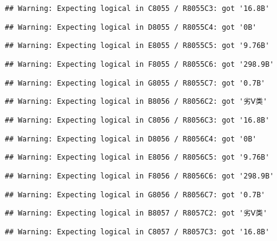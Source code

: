 \documentclass[
]{article}
\begin{document}
\begin{verbatim}
## Warning: Expecting logical in C8055 / R8055C3: got '16.8B'
\end{verbatim}

\begin{verbatim}
## Warning: Expecting logical in D8055 / R8055C4: got '0B'
\end{verbatim}

\begin{verbatim}
## Warning: Expecting logical in E8055 / R8055C5: got '9.76B'
\end{verbatim}

\begin{verbatim}
## Warning: Expecting logical in F8055 / R8055C6: got '298.9B'
\end{verbatim}

\begin{verbatim}
## Warning: Expecting logical in G8055 / R8055C7: got '0.7B'
\end{verbatim}

\begin{verbatim}
## Warning: Expecting logical in B8056 / R8056C2: got '劣Ⅴ类'
\end{verbatim}

\begin{verbatim}
## Warning: Expecting logical in C8056 / R8056C3: got '16.8B'
\end{verbatim}

\begin{verbatim}
## Warning: Expecting logical in D8056 / R8056C4: got '0B'
\end{verbatim}

\begin{verbatim}
## Warning: Expecting logical in E8056 / R8056C5: got '9.76B'
\end{verbatim}

\begin{verbatim}
## Warning: Expecting logical in F8056 / R8056C6: got '298.9B'
\end{verbatim}

\begin{verbatim}
## Warning: Expecting logical in G8056 / R8056C7: got '0.7B'
\end{verbatim}

\begin{verbatim}
## Warning: Expecting logical in B8057 / R8057C2: got '劣Ⅴ类'
\end{verbatim}

\begin{verbatim}
## Warning: Expecting logical in C8057 / R8057C3: got '16.8B'
\end{verbatim}
\end{document}

